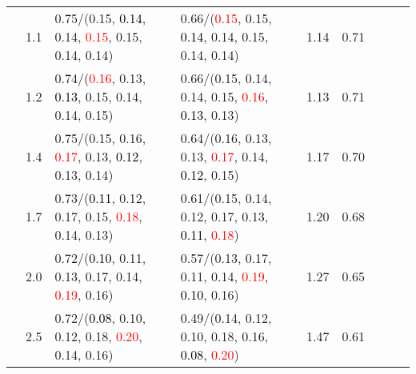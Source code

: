 \documentclass[10pt,a4paper]{report}
\begin{document}
\begin{table}[!htbp]
\begin{center}
{\begin{tabular}{ccllccccc}
				  & 1.1                               & 0.75/(0.15, \textcolor{black}{0.14}, 0.14, \textcolor{red}{0.15}, 0.15, 0.14, 0.14)                                                                                                           & 0.66/(\textcolor{red}{0.15}, 0.15, \textcolor{black}{0.14}, 0.14, 0.15, 0.14, 0.14)                                                                                                           & 1.14             & 0.71                     \\
				  & 1.2                               & 0.74/(\textcolor{red}{0.16}, 0.13, \textcolor{black}{0.13}, 0.15, 0.14, 0.14, 0.15)                                                                                                           & 0.66/(0.15, 0.14, 0.14, 0.15, \textcolor{red}{0.16}, \textcolor{black}{0.13}, 0.13)                                                                                                           & 1.13             & 0.71                     \\
				  & 1.4                               & 0.75/(0.15, 0.16, \textcolor{red}{0.17}, 0.13, \textcolor{black}{0.12}, 0.13, 0.14)                                                                                                           & 0.64/(0.16, 0.13, 0.13, \textcolor{red}{0.17}, 0.14, \textcolor{black}{0.12}, 0.15)                                                                                                           & 1.17             & 0.70                     \\
				  & 1.7                               & 0.73/(\textcolor{black}{0.11}, 0.12, 0.17, 0.15, \textcolor{red}{0.18}, 0.14, 0.13)                                                                                                           & 0.61/(0.15, 0.14, 0.12, 0.17, 0.13, \textcolor{black}{0.11}, \textcolor{red}{0.18})                                                                                                           & 1.20             & 0.68                     \\
				  & 2.0                               & 0.72/(\textcolor{black}{0.10}, 0.11, 0.13, 0.17, 0.14, \textcolor{red}{0.19}, 0.16)                                                                                                           & 0.57/(0.13, 0.17, 0.11, 0.14, \textcolor{red}{0.19}, \textcolor{black}{0.10}, 0.16)                                                                                                           & 1.27             & 0.65                     \\
				  & 2.5                               & 0.72/(\textcolor{black}{0.08}, 0.10, 0.12, 0.18, \textcolor{red}{0.20}, 0.14, 0.16)                                                                                                           & 0.49/(0.14, 0.12, 0.10, 0.18, 0.16, \textcolor{black}{0.08}, \textcolor{red}{0.20})                                                                                                           & 1.47             & 0.61                     \\

\end{tabular}}
\end{center}
\end{table}
\end{document}
